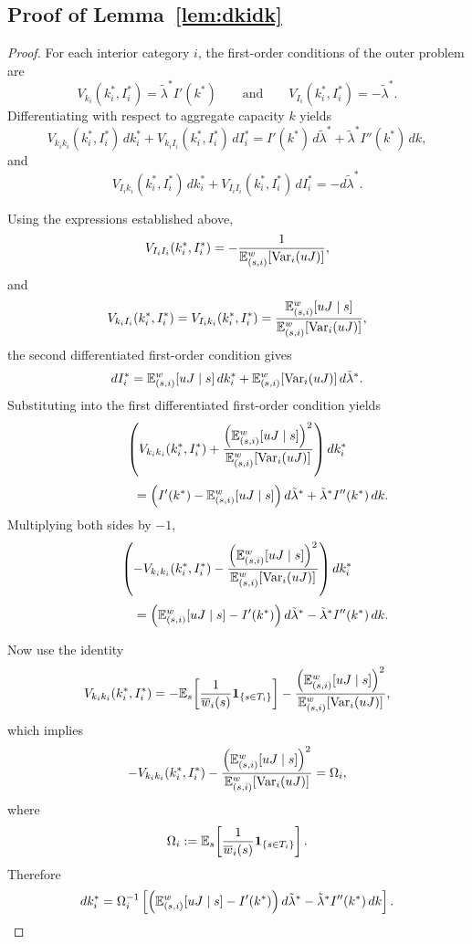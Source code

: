 \documentclass[master.tex]{subfiles}
\begin{document}

\subsection{Proof of Lemma~\ref{lem:dkidk}}
\begin{proof}
For each interior category \(i\), the first-order conditions of the outer problem are
\[
V_{k_i}(k_i^\ast,I_i^\ast)=\tilde\lambda^\ast I'(k^\ast)
\qquad\text{and}\qquad
V_{I_i}(k_i^\ast,I_i^\ast)=-\tilde\lambda^\ast.
\]
Differentiating with respect to aggregate capacity \(k\) yields
\[
V_{k_ik_i}(k_i^\ast,I_i^\ast)\,dk_i^\ast
+
V_{k_iI_i}(k_i^\ast,I_i^\ast)\,dI_i^\ast
=
I'(k^\ast)\,d\tilde\lambda^\ast
+
\tilde\lambda^\ast I''(k^\ast)\,dk,
\]
and
\[
V_{I_ik_i}(k_i^\ast,I_i^\ast)\,dk_i^\ast
+
V_{I_iI_i}(k_i^\ast,I_i^\ast)\,dI_i^\ast
=
-d\tilde\lambda^\ast.
\]

Using the expressions established above,
\[
V_{I_iI_i}(k_i^\ast,I_i^\ast)
=
-\frac{1}{
\mathbb{E}_{(s,i)}^w[\mathrm{Var}_i(uJ)]
},
\]
and
\[
V_{k_iI_i}(k_i^\ast,I_i^\ast)
=
V_{I_ik_i}(k_i^\ast,I_i^\ast)
=
\frac{
\mathbb{E}_{(s,i)}^w[uJ\mid s]
}{
\mathbb{E}_{(s,i)}^w[\mathrm{Var}_i(uJ)]
},
\]
the second differentiated first-order condition gives
\[
dI_i^\ast
=
\mathbb{E}_{(s,i)}^w[uJ\mid s]\,dk_i^\ast
+
\mathbb{E}_{(s,i)}^w[\mathrm{Var}_i(uJ)]\,d\tilde\lambda^\ast.
\]
Substituting into the first differentiated first-order condition yields
\[
\left(
V_{k_ik_i}(k_i^\ast,I_i^\ast)
+
\frac{
\left(
\mathbb{E}_{(s,i)}^w[uJ\mid s]
\right)^2
}{
\mathbb{E}_{(s,i)}^w[\mathrm{Var}_i(uJ)]
}
\right) dk_i^\ast
\]
\[
\qquad\qquad
=
\left(
I'(k^\ast)
-
\mathbb{E}_{(s,i)}^w[uJ\mid s]
\right)d\tilde\lambda^\ast
+
\tilde\lambda^\ast I''(k^\ast)\,dk.
\]
Multiplying both sides by \(-1\),
\[
\left(
-
V_{k_ik_i}(k_i^\ast,I_i^\ast)
-
\frac{
\left(
\mathbb{E}_{(s,i)}^w[uJ\mid s]
\right)^2
}{
\mathbb{E}_{(s,i)}^w[\mathrm{Var}_i(uJ)]
}
\right) dk_i^\ast
\]
\[
\qquad\qquad
=
\left(
\mathbb{E}_{(s,i)}^w[uJ\mid s]
-
I'(k^\ast)
\right)d\tilde\lambda^\ast
-
\tilde\lambda^\ast I''(k^\ast)\,dk.
\]

Now use the identity
\[
V_{k_ik_i}(k_i^\ast,I_i^\ast)
=
-\mathbb{E}_s\!\left[\frac{1}{\overline w_i(s)}\mathbf 1_{\{s\in T_i\}}\right]
-\frac{
\left(
\mathbb{E}_{(s,i)}^w[uJ\mid s]
\right)^2
}{
\mathbb{E}_{(s,i)}^w[\mathrm{Var}_i(uJ)]
},
\]
which implies
\[
-
V_{k_ik_i}(k_i^\ast,I_i^\ast)
-
\frac{
\left(
\mathbb{E}_{(s,i)}^w[uJ\mid s]
\right)^2
}{
\mathbb{E}_{(s,i)}^w[\mathrm{Var}_i(uJ)]
}
=
\Omega_i,
\]
where
\[
\Omega_i
:=
\mathbb{E}_s\!\left[\frac{1}{\overline w_i(s)}\mathbf 1_{\{s\in T_i\}}\right].
\]
Therefore
\[
dk_i^\ast
=
\Omega_i^{-1}
\left[
\left(
\mathbb{E}_{(s,i)}^w[uJ\mid s]
-I'(k^\ast)
\right)d\tilde\lambda^\ast
-
\tilde\lambda^\ast I''(k^\ast)\,dk
\right].
\]


\end{proof}
\end{document}
